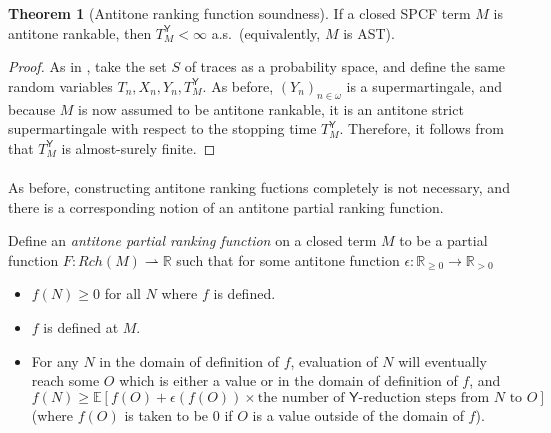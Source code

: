 \documentclass{article}
\newcommand{\tY}{\mathsf{Y}}
\theoremstyle{definition}
\theoremstyle{lemma}
\newtheorem{theorem}{Theorem}
\theoremstyle{remark}
\begin{document}
\begin{theorem}[Antitone ranking function soundness] \label{thm:antitone rankable implies termination}
If a closed SPCF term $M$ is antitone rankable, then $T_M^{\tY} < \infty$ a.s.~(equivalently, $M$ is AST).
\end{theorem}
\begin{proof}
As in %
,
take the set $S$ of traces as a probability space, and define the same random variables $T_n, X_n, Y_n, T_M^{\tY}$. As before, $(Y_n)_{n \in \omega}$ is a supermartingale, and because $M$ is now assumed to be antitone rankable, it is an antitone strict supermartingale with respect to the stopping time $T_M^{\tY}$. Therefore, it follows from  that $T_M^{\tY}$ is almost-surely finite.
\end{proof}

\paragraph{}
As before, constructing antitone ranking fuctions completely is not necessary, and there is a corresponding notion of an antitone partial ranking function.

Define an \emph{antitone partial ranking function} on a closed term $M$ to be a partial function $F : Rch(M) \rightharpoonup \mathbb{R}$ such that for some antitone function $\epsilon : \mathbb{R}_{\geq 0} \to \mathbb{R}_{>0}$
\begin{itemize}
\item $f(N) \geq 0$ for all $N$ where $f$ is defined.
\item $f$ is defined at $M$.
\item For any $N$ in the domain of definition of $f$, evaluation of $N$ will eventually reach some $O$ which is either a value or in the domain of definition of $f$, and $f(N) \geq \mathbb E [f(O) + \epsilon(f(O)) \times \text{the number of $\tY$-reduction steps from $N$ to $O$}]$ (where $f(O)$ is taken to be 0 if $O$ is a value outside of the domain of $f$).
\end{itemize}
\end{document}
